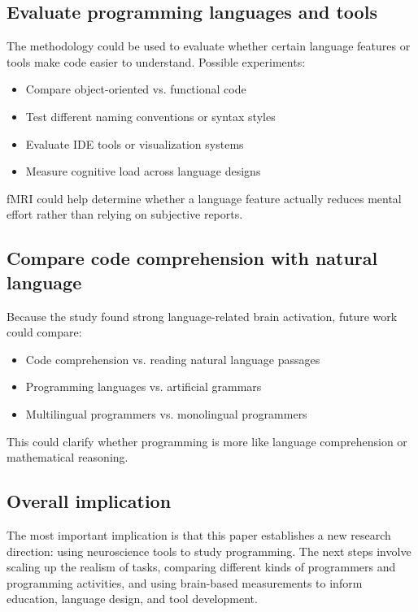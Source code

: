 \subsection{Evaluate programming languages and tools}

The methodology could be used to evaluate whether certain language features or tools make code easier to understand. Possible experiments:
\begin{itemize}
    \item Compare object-oriented vs. functional code
    \item Test different naming conventions or syntax styles
    \item Evaluate IDE tools or visualization systems
    \item Measure cognitive load across language designs
\end{itemize}
fMRI could help determine whether a language feature actually reduces mental effort rather than relying on subjective reports.

\subsection{Compare code comprehension with natural language}

Because the study found strong language-related brain activation, future work could compare:
\begin{itemize}
    \item Code comprehension vs. reading natural language passages
    \item Programming languages vs. artificial grammars
    \item Multilingual programmers vs. monolingual programmers
\end{itemize}
This could clarify whether programming is more like language comprehension or mathematical reasoning.

\subsection{Overall implication}

The most important implication is that this paper establishes a new research direction: using neuroscience tools to study programming. The next steps involve scaling up the realism of tasks, comparing different kinds of programmers and programming activities, and using brain-based measurements to inform education, language design, and tool development.